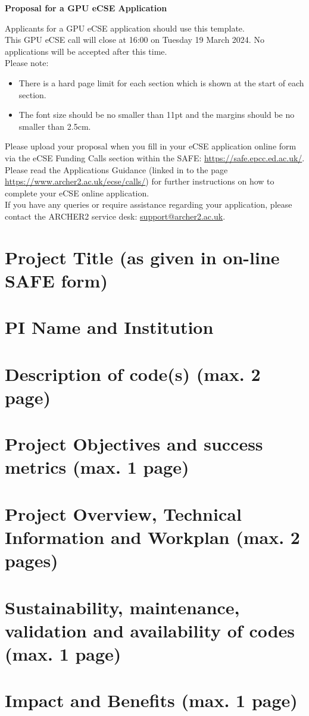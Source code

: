 \documentclass[a4paper,11pt]{article}
\title{}
\author{}
\date{\today}
\begin{document}
\begin{center}
\huge \textbf{Proposal for a GPU eCSE Application}\\
\end{center}
Applicants for a GPU eCSE application should use this template.\\

\noindent This GPU eCSE call will close at 16:00 on Tuesday 19 March 2024. No applications will be accepted after this time.\\

\noindent Please note:
\begin{itemize}
	\item There is a hard page limit for each section which is shown at the start of each section. 
	\item The font size should be no smaller than 11pt and the margins should be no smaller than 2.5cm. 
\end{itemize}

\noindent Please upload your proposal when you fill in your eCSE application online form via the eCSE Funding Calls section within the SAFE: \url{https://safe.epcc.ed.ac.uk/}.\\

\noindent Please read the Applications Guidance (linked in to the page \url{https://www.archer2.ac.uk/ecse/calls/}) for further instructions on how to complete your eCSE online application.\\

\noindent If you have any queries or require assistance regarding your application, please contact the ARCHER2 service desk: \url{support@archer2.ac.uk}.

\section{Project Title (as given in on-line SAFE form)}

\section{PI Name and Institution}

\clearpage
\section{Description of code(s) (max. 2 page)}

\clearpage
\section{Project Objectives and success metrics (max. 1 page)}

\clearpage
\section{Project Overview, Technical Information and Workplan (max. 2 pages)}

\clearpage
\section{Sustainability, maintenance, validation and {{availability}} of codes (max. 1 page)}

\clearpage
\section{Impact and Benefits (max. 1 page)}
\end{document}
